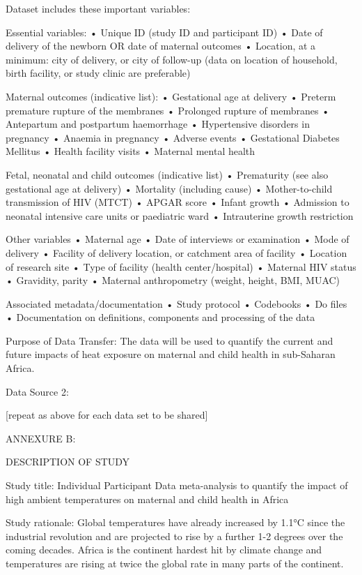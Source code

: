 \documentclass[12pt,letterpaper]{article}
\begin{document}
Dataset includes these important variables:

Essential variables: •	Unique ID (study ID and participant ID) •	Date of delivery of the newborn OR date of maternal outcomes •	Location, at a minimum: city of delivery, or city of follow-up (data on location of household, birth facility, or study clinic are preferable)

Maternal outcomes (indicative list): •	Gestational age at delivery •	Preterm premature rupture of the membranes •	Prolonged rupture of membranes •	Antepartum and postpartum haemorrhage •	Hypertensive disorders in pregnancy •	Anaemia in pregnancy •	Adverse events •	Gestational Diabetes Mellitus •	Health facility visits  •	Maternal mental health

Fetal, neonatal and child outcomes (indicative list) •	Prematurity (see also gestational age at delivery) •	Mortality (including cause) •	Mother-to-child transmission of HIV (MTCT) •	APGAR score •	Infant growth •	Admission to neonatal intensive care units or paediatric ward •	Intrauterine growth restriction

Other variables •	Maternal age •	Date of interviews or examination •	Mode of delivery •	Facility of delivery location, or catchment area of facility •	Location of research site •	Type of facility (health center/hospital) •	Maternal HIV status •	Gravidity, parity •	Maternal anthropometry (weight, height, BMI, MUAC)

Associated metadata/documentation •	Study protocol •	Codebooks •	Do files •	Documentation on definitions, components and processing of the data

Purpose of Data Transfer: The data will be used to quantify the current and future impacts of heat exposure on maternal and child health in sub-Saharan Africa.

Data Source 2:

[repeat as above for each data set to be shared]

ANNEXURE B: 

DESCRIPTION OF STUDY

Study title: Individual Participant Data meta-analysis to quantify the impact of high ambient temperatures on maternal and child health in Africa

Study rationale: Global temperatures have already increased by 1.1°C since the industrial revolution and are projected to rise by a further 1-2 degrees over the coming decades. Africa is the continent hardest hit by climate change and temperatures are rising at twice the global rate in many parts of the continent. 
\end{document}
